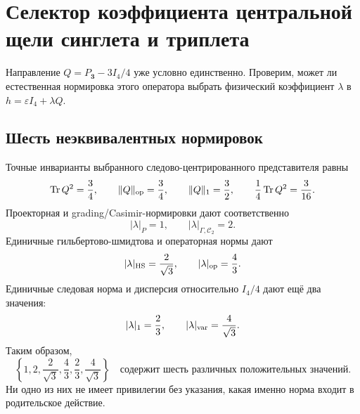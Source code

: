 \chapter{Селектор коэффициента центральной щели синглета и триплета}
\label{ch:v8-baryon-c0-singlet-triplet-central-gap-coefficient-selector-gate}

Направление $Q=P_{\mathbf3}-3I_4/4$ уже условно единственно. Проверим,
может ли естественная нормировка этого оператора выбрать физический
коэффициент $\lambda$ в $h=\varepsilon I_4+\lambda Q$.

\section{Шесть неэквивалентных нормировок}

Точные инварианты выбранного следово-центрированного представителя равны
\begin{equation}
 \operatorname{Tr} Q^2=\frac34,
 \qquad \lVert Q\rVert_{\rm op}=\frac34,
 \qquad \lVert Q\rVert_1=\frac32,
 \qquad \frac14\operatorname{Tr} Q^2=\frac3{16}.
 \label{eq:v8-baryon-c0-central-gap-coefficient-q-invariants}
\end{equation}
Проекторная и grading/Casimir-нормировки дают соответственно
\begin{equation}
 |\lambda|_{P}=1,
 \qquad
 |\lambda|_{\Gamma,\mathcal C_2}=2.
 \label{eq:v8-baryon-c0-central-gap-projector-grading-normalizations}
\end{equation}
Единичные гильбертово-шмидтова и операторная нормы дают
\begin{equation}
 |\lambda|_{\rm HS}=\frac2{\sqrt3},
 \qquad
 |\lambda|_{\rm op}=\frac43.
 \label{eq:v8-baryon-c0-central-gap-hs-operator-normalizations}
\end{equation}
Единичные следовая норма и дисперсия относительно $I_4/4$ дают ещё два
значения:
\begin{equation}
 |\lambda|_1=\frac23,
 \qquad
 |\lambda|_{\rm var}=\frac4{\sqrt3}.
 \label{eq:v8-baryon-c0-central-gap-trace-variance-normalizations}
\end{equation}
Таким образом,
\begin{equation}
 \left\{1,2,\frac2{\sqrt3},\frac43,\frac23,\frac4{\sqrt3}\right\}
 \quad\text{содержит шесть различных положительных значений}.
 \label{eq:v8-baryon-c0-central-gap-six-distinct-normalizations}
\end{equation}
Ни одно из них не имеет привилегии без указания, какая именно норма входит
в родительское действие.

